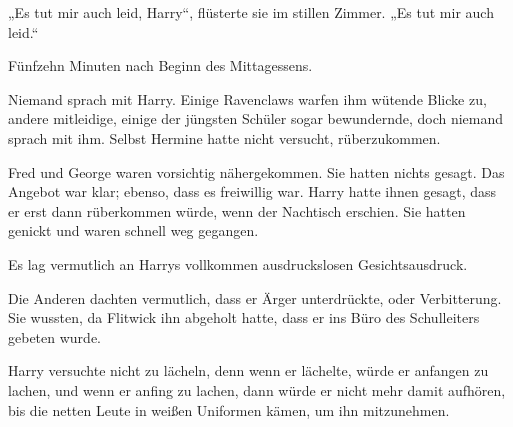 „Es tut mir auch leid, Harry“, flüsterte sie im stillen Zimmer. „Es tut mir auch leid.“

\later

Fünfzehn Minuten nach Beginn des Mittagessens.

Niemand sprach mit Harry. Einige Ravenclaws warfen ihm wütende Blicke zu, andere mitleidige, einige der jüngsten Schüler sogar bewundernde, doch niemand sprach mit ihm. Selbst Hermine hatte nicht versucht, rüberzukommen.

Fred und George waren vorsichtig nähergekommen. Sie hatten nichts gesagt. Das Angebot war klar; ebenso, dass es freiwillig war. Harry hatte ihnen gesagt, dass er erst dann rüberkommen würde, wenn der Nachtisch erschien. Sie hatten genickt und waren schnell weg gegangen.

Es lag vermutlich an Harrys vollkommen ausdruckslosen Gesichtsausdruck.

Die Anderen dachten vermutlich, dass er Ärger unterdrückte, oder Verbitterung. Sie wussten, da Flitwick ihn abgeholt hatte, dass er ins Büro des Schulleiters gebeten wurde.

Harry versuchte nicht zu lächeln, denn wenn er lächelte, würde er anfangen zu lachen, und wenn er anfing zu lachen, dann würde er nicht mehr damit aufhören, bis die netten Leute in weißen Uniformen kämen, um ihn mitzunehmen.

